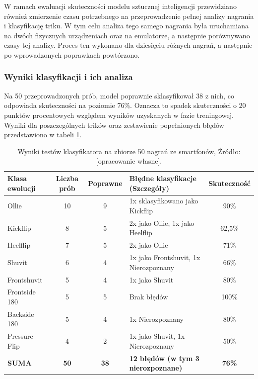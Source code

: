             W ramach ewaluacji skuteczności modelu sztucznej inteligencji przewidziano również zmierzenie czasu potrzebnego na przeprowadzenie pełnej analizy nagrania i klasyfikację triku. W tym celu analiza tego samego nagrania była uruchamiana na dwóch fizycznych urządzeniach oraz na emulatorze, a następnie porównywano czasy tej analizy. Proces ten wykonano dla dziesięciu różnych nagrań, a następnie po wprowadzonych poprawkach powtórzono.
            
        \subsubsection{Wyniki klasyfikacji i ich analiza}

            Na 50 przeprowadzonych prób, model poprawnie sklasyfikował 38 z nich, co odpowiada skuteczności na poziomie 76\%. Oznacza to spadek skuteczności o 20 punktów procentowych względem wyników uzyskanych w fazie treningowej. Wyniki dla poszczególnych trików oraz zestawienie popełnionych błędów przedstawiono w tabeli \ref{tab:field_tests}.

            \begin{table}[!ht] \centering
                \caption{Wyniki testów klasyfikatora na zbiorze 50 nagrań ze smartfonów, Źródło: [opracowanie własne].}
                \label{tab:field_tests} 
                \begin{tabularx}{\textwidth}{ | l | c | c | X | c | } \hline
                    \textbf{Klasa ewolucji} & \textbf{Liczba prób} & \textbf{Poprawne} & \textbf{Błędne klasyfikacje (Szczegóły)} & \textbf{Skuteczność} \\ \hline
                    Ollie & 10 & 9 & 1x sklasyfikowano jako Kickflip & 90\% \\ \hline
                    Kickflip & 8 & 5 & 2x jako Ollie, 1x jako Heelflip & 62,5\% \\ \hline
                    Heelflip & 7 & 5 & 2x jako Ollie & 71\% \\ \hline
                    Shuvit & 6 & 4 & 1x jako Frontshuvit, 1x Nierozpoznany & 66\% \\ \hline
                    Frontshuvit & 5 & 4 & 1x jako Shuvit & 80\% \\ \hline
                    Frontside 180 & 5 & 5 & Brak błędów & 100\% \\ \hline
                    Backside 180 & 5 & 4 & 1x Nierozpoznany & 80\% \\ \hline
                    Pressure Flip & 4 & 2 & 1x jako Shuvit, 1x Nierozpoznany & 50\% \\ \hline
                    \textbf{SUMA} & \textbf{50} & \textbf{38} & \textbf{12 błędów (w tym 3 nierozpoznane)} & \textbf{76\%} \\ \hline
                \end{tabularx}
            \end{table}

